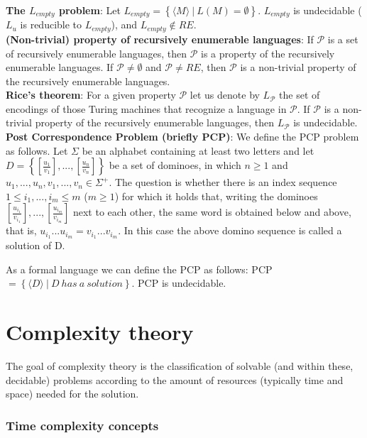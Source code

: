 \documentclass[margin=0px]{article}
\begin{document}
\noindent \textbf{The $L_{empty}$ problem}: Let $L_{empty} = \left\{\langle M \rangle \ |\ L(M) = \emptyset \right\}$.
$L_{empty}$ is undecidable ($L_{u}$ is reducible to $L_{empty}$), and $L_{empty} \notin RE$.\\

\noindent \textbf{(Non-trivial) property of recursively enumerable languages}: If $\mathcal{P}$ is a set of recursively
enumerable languages, then $\mathcal{P}$ is a property of the recursively enumerable languages. If $\mathcal{P} \not = \emptyset$ and
$\mathcal{P} \not = RE$, then $\mathcal{P}$ is a non-trivial property of the recursively enumerable languages.\\

\noindent \textbf{Rice's theorem}:
For a given property $\mathcal{P}$ let us denote by $L_{\mathcal{P}}$ the set of encodings of those Turing machines that
recognize a language in $\mathcal{P}$. If $\mathcal{P}$ is a non-trivial property of the recursively enumerable languages, then
$L_{\mathcal{P}}$ is undecidable.\\

\noindent \textbf{Post Correspondence Problem (briefly PCP)}: We define the PCP problem as follows. Let
$\Sigma$ be an alphabet containing at least two letters and let $D = \left\{[\frac{u_{1}}{v_{1}}], ..., [\frac{u_{n}}{v_{n}}]\right\}$
be a set of dominoes, in which $n \geq 1$ and $u_{1}, ..., u_{n}, v_{1}, ..., v_{n} \in \Sigma^{+}$. The question is whether there is an
index sequence $1 \leq i_{1}, ..., i_{m} \leq m$ ($m \geq 1$) for which it holds that, writing the dominoes
$[\frac{u_{i_{1}}}{v_{i_{1}}}], ..., [\frac{u_{i_{m}}}{v_{i_{m}}}]$ next to each other, the same word is obtained below and above, that is,
$u_{i_{1}} ... u_{i_{m}} = v_{i_{1}} ... v_{i_{m}}$. In this case the above domino sequence is called a solution of D.

As a formal language we can define the PCP as follows:
PCP $= \left\{ \langle D \rangle \ |\ D \ has \ a \ solution \right\}$. PCP is undecidable.

\section{Complexity theory}

The goal of complexity theory is the classification of solvable (and within these, decidable) problems according to the
amount of resources (typically time and space) needed for the solution.

\subsubsection{Time complexity concepts}
\end{document}
